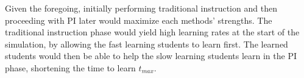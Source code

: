 Given the foregoing, initially performing traditional instruction and then proceeding with PI later would maximize each methods' strengths. 
The traditional instruction phase would yield high learning rates at the start of the simulation, by allowing the fast learning students to learn first.
The learned students would then be able to help the slow learning students learn in the PI phase, shortening the time to learn $t_{max}$.

